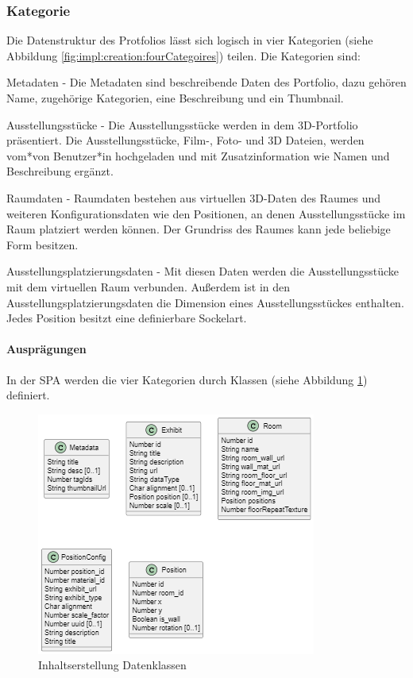 \subsubsection{Kategorie}
\label{sec:wizard:categories}
Die Datenstruktur des Protfolios lässt sich logisch in vier Kategorien (siehe Abbildung \ref{fig:impl:creation:fourCategoires}) teilen. 
Die Kategorien sind:
\begin{compactitem}
\item Metadaten - Die Metadaten sind beschreibende Daten des Portfolio, dazu gehören Name, zugehörige Kategorien, eine Beschreibung und ein Thumbnail.
\item Ausstellungsstücke - Die Ausstellungsstücke werden in dem 3D-Portfolio präsentiert. Die Ausstellungsstücke, Film-, Foto- und 3D Dateien,  werden vom*von Benutzer*in hochgeladen und mit Zusatzinformation wie Namen und Beschreibung ergänzt. 
\item Raumdaten - Raumdaten bestehen aus virtuellen 3D-Daten des Raumes und weiteren Konfigurationsdaten wie den Positionen, an denen Ausstellungsstücke im Raum platziert werden können. Der Grundriss des Raumes kann jede beliebige Form besitzen. 
\item Ausstellungsplatzierungsdaten - Mit diesen Daten werden die Ausstellungsstücke mit dem virtuellen Raum verbunden. Außerdem ist in den Ausstellungsplatzierungsdaten die Dimension eines Ausstellungsstückes enthalten. Jedes Position besitzt eine definierbare Sockelart. 
\end{compactitem}

\paragraph{Ausprägungen}
In der SPA werden die vier Kategorien durch Klassen (siehe Abbildung \ref{fig:impl:creation:dataclasses}) definiert. 

\begin{figure}[ht]
    \centering
    \includegraphics[scale=0.9]{pics/content_creation_classes.png}
    \caption{Inhaltserstellung Datenklassen}
    \label{fig:impl:creation:dataclasses}
\end{figure}

